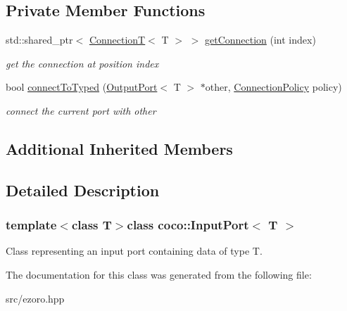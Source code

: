 \subsection*{Private Member Functions}
\begin{DoxyCompactItemize}
\item 
\hypertarget{classcoco_1_1_input_port_a4182500b2ff28fa95628d645f18ba457}{std\-::shared\-\_\-ptr$<$ \hyperlink{classcoco_1_1_connection_t}{Connection\-T}$<$ T $>$ $>$ \hyperlink{classcoco_1_1_input_port_a4182500b2ff28fa95628d645f18ba457}{get\-Connection} (int index)}\label{classcoco_1_1_input_port_a4182500b2ff28fa95628d645f18ba457}

\begin{DoxyCompactList}\small\item\em get the connection at position {\ttfamily index} \end{DoxyCompactList}\item 
\hypertarget{classcoco_1_1_input_port_aff01c8e8366eb6b7b5911fd10a6acc00}{bool \hyperlink{classcoco_1_1_input_port_aff01c8e8366eb6b7b5911fd10a6acc00}{connect\-To\-Typed} (\hyperlink{classcoco_1_1_output_port}{Output\-Port}$<$ T $>$ $\ast$other, \hyperlink{structcoco_1_1_connection_policy}{Connection\-Policy} policy)}\label{classcoco_1_1_input_port_aff01c8e8366eb6b7b5911fd10a6acc00}

\begin{DoxyCompactList}\small\item\em connect the current port with {\ttfamily other} \end{DoxyCompactList}\end{DoxyCompactItemize}
\subsection*{Additional Inherited Members}


\subsection{Detailed Description}
\subsubsection*{template$<$class T$>$class coco\-::\-Input\-Port$<$ T $>$}

Class representing an input port containing data of type T. 

The documentation for this class was generated from the following file\-:\begin{DoxyCompactItemize}
\item 
src/ezoro.\-hpp\end{DoxyCompactItemize}
